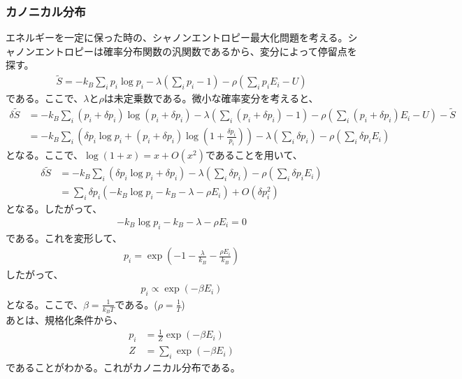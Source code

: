 \documentclass[a4paper,11pt]{jsarticle}
\numberwithin{equation}{section}
\begin{document}
\subsubsection{カノニカル分布}
エネルギーを一定に保った時の、シャノンエントロピー最大化問題を考える。シャノンエントロピーは確率分布関数の汎関数であるから、変分によって停留点を探す。
\begin{align}
  \tilde{S}= -k_B\sum_{i}p_i\log p_i -\lambda\left(\sum_{i}p_i - 1\right)-\rho\left(\sum_{i}p_iE_i - U\right)  
\end{align}
である。ここで、$\lambda$と$\rho$は未定乗数である。微小な確率変分を考えると、
\begin{align}
  \delta \tilde{S} &= -k_B\sum_{i}(p_i + \delta p_i)\log (p_i + \delta p_i) -\lambda\left(\sum_{i}(p_i + \delta p_i)- 1\right) -\rho\left(\sum_{i}(p_i + \delta p_i)E_i - U\right)-\tilde{S}\\
  &= -k_B\sum_{i}\left(\delta p_i\log p_i + (p_i + \delta p_i)\log \left(1 + \frac{\delta p_i}{p_i}\right)\right)  -\lambda\left(\sum_{i}\delta p_i\right)-\rho\left(\sum_{i}\delta p_iE_i\right)
\end{align}
となる。ここで、$\log(1+x) = x + O(x^2)$であることを用いて、
\begin{align}
  \delta \tilde{S} &= -k_B\sum_{i}\left(\delta p_i\log p_i + \delta p_i\right)  -\lambda\left(\sum_{i}\delta p_i\right)-\rho\left(\sum_{i}\delta p_iE_i\right)\\
  &= \sum_{i}\delta p_i\left(-k_B\log p_i - k_B - \lambda - \rho E_i\right) + O(\delta p_i^2)
\end{align}
となる。したがって、
\begin{align}
  -k_B\log p_i - k_B - \lambda - \rho E_i = 0
\end{align}
である。これを変形して、
\begin{align}
  p_i = \exp(-1-\frac{\lambda}{k_B}-\frac{\rho E_i}{k_B})
\end{align}
したがって、
\begin{align}
  p_i \propto \exp(-\beta E_i)
\end{align}
となる。ここで、$\beta = \frac{1}{k_B T}$である。($\rho = \frac{1}{T}$)\\
あとは、規格化条件から、
\begin{align}
    p_i &= \frac{1}{Z} \exp(-\beta E_i)\\
    Z &= \sum_{i} \exp(-\beta E_i)
\end{align}
であることがわかる。これがカノニカル分布である。\\
\end{document}
